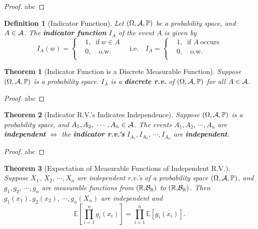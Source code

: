 \documentclass[openany,12pt]{book}
\newtheorem{theorem}{Theorem}[chapter]
\newtheorem{definition}{Definition}[chapter]
\begin{document}
\begin{proof}
  abc
\end{proof}

\begin{definition}[Indicator Function]
Let $(\Omega,\mathcal{A},\mathbb{P})$ be a probability space, and $A \in \mathcal{A}$. The \textbf{indicator function} $I_{A}$ of the event $A$ is given by
\[I_{A}(w) = \left\{ \begin{aligned}
&1,\ \mathrm{\text{\ if}}\ w \in A \\
&0,\quad \mathrm{\text{o.w.}} \\
\end{aligned} \right.\quad \mathrm{\text{i.e.}}\quad I_{A} = \left\{ \begin{aligned}
&1,\ \mathrm{\text{ if }} A \ \mathrm{\text{occurs}} \\
&0,\quad \mathrm{\text{o.w.}} \\
\end{aligned} \right.\]
\end{definition}

\begin{theorem}[Indicator Function is a Discrete Measurable Function]
Suppose $(\Omega,\mathcal{A},\mathbb{P})$ is a probability space. $I_{A}$ is a \textbf{discrete r.v.} of $(\Omega,\mathcal{A},\mathbb{P})$ for all $A \in \mathcal{A}$.
\end{theorem}

\begin{proof}
  abc
\end{proof}

\begin{theorem}[Indicator R.V.'s Indicates Independence]
Suppose $(\Omega,\mathcal{A},\mathbb{P})$ is a probability space, and $A_{1},A_{2},\ \cdots,A_{n} \in \ma$. The events $A_{1},A_{2},\ \cdots,A_{n}$ are \textbf{independent} $\Leftrightarrow$ the \textbf{indicator r.v.'s}
$I_{A_{1}},I_{A_{2}},\ \cdots,I_{A_{n}}$ are \textbf{independent}.
\end{theorem}

\begin{proof}
  abc
\end{proof}

\begin{theorem}[Expectation of Measurable Functions of Independent R.V.]
Suppose $X_{1},\ X_{2},\ \cdots,X_{n}$ are independent r.v.'s of a
probability space $(\Omega,\mathcal{A},\mathbb{P})$, and $g_{1},g_{2},\ \cdots,g_{n}$ are measurable functions from $\mathbb{(R,}\mathcal{B}_{\mathbb{R}})$ to
$\mathbb{(R,}\mathcal{B}_{\mathbb{R}})$. Then $g_{1}(x_{1}),g_{2}(x_{2}),\ \cdots,g_{n}(X_{n})$ are independent and
\[\mathbb{E}\left[ \prod_{i = 1}^{n}{g_{i}(x_{i})} \right] = \prod_{i = 1}^{n}{\mathbb{E}[ g_{i}(x_{i})]}.\]
\end{theorem}
\end{document}
